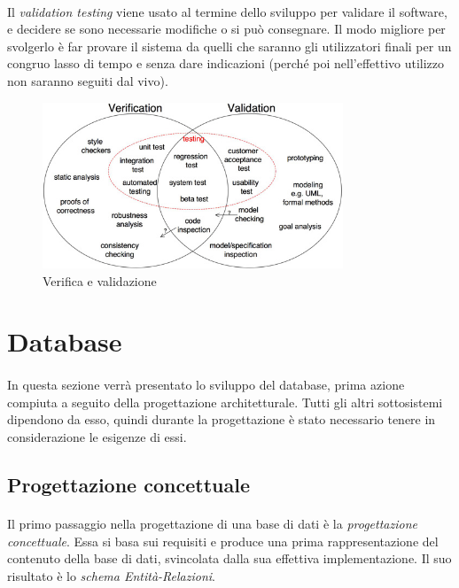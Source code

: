 \documentclass[11pt,a4paper,english]{article}
\begin{document}
\paragraph{} Il \emph{validation testing} viene usato al termine dello sviluppo per validare il software, e decidere se sono necessarie modifiche o si può consegnare. Il modo migliore per svolgerlo è far provare il sistema da quelli che saranno gli utilizzatori finali per un congruo lasso di tempo e senza dare indicazioni (perché poi nell'effettivo utilizzo non saranno seguiti dal vivo). 

\begin{figure}[H]
    \centering
    \includegraphics[width=0.8\textwidth]{img/verifica_validazione.jpg}
    \caption{Verifica e validazione}
\end{figure}



\section{Database}

\paragraph{} In questa sezione verrà presentato lo sviluppo del database, prima azione compiuta a seguito della progettazione architetturale. Tutti gli altri sottosistemi dipendono da esso, quindi durante la progettazione è stato necessario tenere in considerazione le esigenze di essi.

\subsection{Progettazione concettuale}

\paragraph{} Il primo passaggio nella progettazione di una base di dati è la \emph{progettazione concettuale}. Essa si basa sui requisiti e produce una prima rappresentazione del contenuto della base di dati, svincolata dalla sua effettiva implementazione. Il suo risultato è lo \emph{schema Entità-Relazioni}. 
\end{document}
